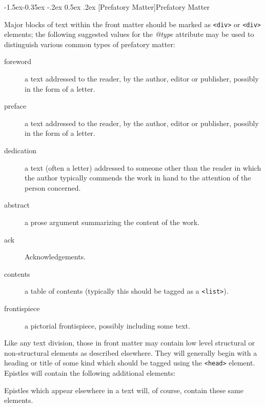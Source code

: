 \documentclass[11pt,twoside]{article}\makeatletter
\makeatletter
\renewcommand\subsubsection{\@startsection{subsubsection}{3}{\z@}%
     {-1.5ex\@plus -0.35ex \@minus -.2ex}%
     {0.5ex \@plus .2ex}%
     {\reset@font\large\sffamily}}
\makeatother
\begin{document}
\subsubsection[{Prefatory Matter}]{Prefatory Matter}\label{h52}\par
Major blocks of text within the front matter should be marked as \texttt{<div>} or \texttt{<div>} elements; the following suggested values for the \textit{@type} attribute may be used to distinguish various common types of prefatory matter: \begin{description}

\item[{foreword}]a text addressed to the reader, by the author, editor or publisher, possibly in the form of a letter.
\item[{preface}]a text addressed to the reader, by the author, editor or publisher, possibly in the form of a letter.
\item[{dedication}]a text (often a letter) addressed to someone other than the reader in which the author typically commends the work in hand to the attention of the person concerned.
\item[{abstract}]a prose argument summarizing the content of the work.
\item[{ack}]Acknowledgements.
\item[{contents}]a table of contents (typically this should be tagged as a \texttt{<list>}).
\item[{frontispiece}]a pictorial frontispiece, possibly including some text.
\end{description} \par
Like any text division, those in front matter may contain low level structural or non-structural elements as described elsewhere. They will generally begin with a heading or title of some kind which should be tagged using the \texttt{<head>} element. Epistles will contain the following additional elements: \par
Epistles which appear elsewhere in a text will, of course, contain these same elements.\par
\end{document}
